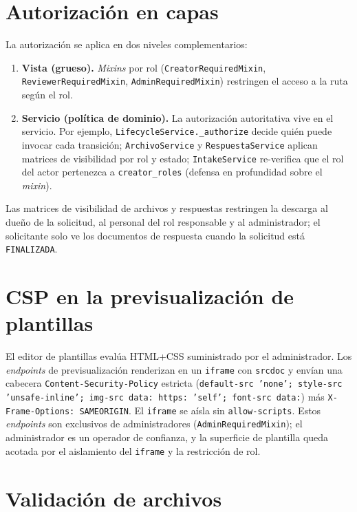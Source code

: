 \documentclass[12pt,letterpaper]{report}
\begin{document}
\section{Autorización en capas}

La autorización se aplica en dos niveles complementarios:

\begin{enumerate}[leftmargin=1.6em]
  \item \textbf{Vista (grueso).} \textit{Mixins} por rol
  (\texttt{CreatorRequiredMixin}, \texttt{ReviewerRequiredMixin},
  \texttt{AdminRequiredMixin}) restringen el acceso a la ruta según el rol.
  \item \textbf{Servicio (política de dominio).} La autorización autoritativa vive
  en el servicio. Por ejemplo, \texttt{LifecycleService.\_authorize} decide quién
  puede invocar cada transición; \texttt{ArchivoService} y
  \texttt{RespuestaService} aplican matrices de visibilidad por rol y estado;
  \texttt{IntakeService} re-verifica que el rol del actor pertenezca a
  \texttt{creator\_roles} (defensa en profundidad sobre el \textit{mixin}).
\end{enumerate}

Las matrices de visibilidad de archivos y respuestas restringen la descarga al
dueño de la solicitud, al personal del rol responsable y al administrador; el
solicitante solo ve los documentos de respuesta cuando la solicitud está
\texttt{FINALIZADA}.

\section{CSP en la previsualización de plantillas}

El editor de plantillas evalúa HTML+CSS suministrado por el administrador. Los
\textit{endpoints} de previsualización renderizan en un \texttt{iframe} con
\texttt{srcdoc} y envían una cabecera \texttt{Content-Security-Policy} estricta
(\texttt{default-src 'none'; style-src 'unsafe-inline'; img-src data: https:
'self'; font-src data:}) más \texttt{X-Frame-Options: SAMEORIGIN}. El
\texttt{iframe} se aísla sin \texttt{allow-scripts}. Estos \textit{endpoints} son
exclusivos de administradores (\texttt{AdminRequiredMixin}); el administrador es
un operador de confianza, y la superficie de plantilla queda acotada por el
aislamiento del \texttt{iframe} y la restricción de rol.

\section{Validación de archivos}
\end{document}
